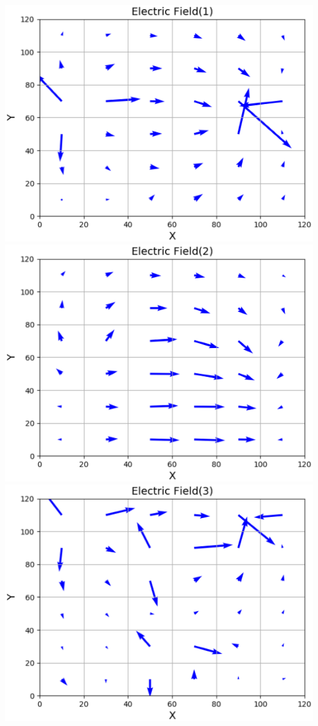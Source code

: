 \documentclass[uplatex,a4paper,11pt,oneside,openany]{jsbook}
\begin{document}
\includegraphics[scale=0.62]{./figure/Efield1.eps}
\vfill
\includegraphics[scale=0.62]{./figure/Efield2.eps}
\vfill
\includegraphics[scale=0.62]{./figure/Efield3.eps}
\end{document}
